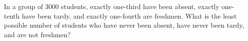 In a group of $3000$ students, exactly one-third have been absent, exactly one-tenth have been tardy, and exactly one-fourth are freshmen. What is the least possible number of students who have never been absent, have never been tardy, and are not freshmen?
